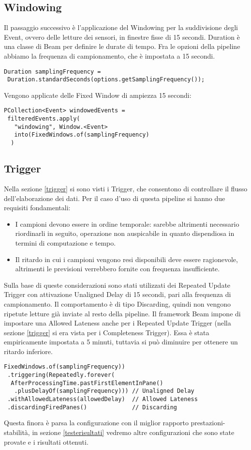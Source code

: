 \subsection{Windowing}
Il passaggio successivo è l'applicazione del Windowing per la suddivisione degli Event, ovvero delle letture dei sensori, in finestre fisse di 15 secondi. 
Duration è una classe di Beam per definire le durate di tempo. Fra le opzioni della pipeline abbiamo la frequenza di campionamento, che è impostata a 15 secondi.
\begin{lstlisting}
Duration samplingFrequency = 
 Duration.standardSeconds(options.getSamplingFrequency());
\end{lstlisting}
Vengono applicate delle Fixed Window di ampiezza 15 secondi:
\begin{lstlisting}
PCollection<Event> windowedEvents = 
 filteredEvents.apply(
   "windowing", Window.<Event> 
   into(FixedWindows.of(samplingFrequency)
  )
\end{lstlisting}
\subsection{Trigger}
Nella sezione \ref{trigger} si sono visti i Trigger, che consentono di controllare il flusso dell'elaborazione dei dati. Per il caso d'uso di questa pipeline si hanno due requisiti fondamentali:
\begin{itemize}
\item I campioni devono essere in ordine temporale: sarebbe altrimenti necessario riordinarli in seguito, operazione non auspicabile in quanto dispendiosa in termini di computazione e tempo.
\item Il ritardo in cui i campioni vengono resi disponibili deve essere ragionevole, altrimenti le previsioni verrebbero fornite con frequenza insufficiente.
\end{itemize}
Sulla base di queste considerazioni sono stati utilizzati dei Repeated Update Trigger con attivazione Unaligned Delay di 15 secondi, pari alla frequenza di campionamento. Il comportamento è di tipo Discarding, quindi non vengono ripetute letture già inviate al resto della pipeline. Il framework Beam impone di impostare una Allowed Lateness anche per i Repeated Update Trigger (nella sezione \ref{trigger} si era vista per i Completeness Trigger). Essa è stata empiricamente impostata a 5 minuti, tuttavia si può diminuire per ottenere un ritardo inferiore.
\begin{lstlisting}
FixedWindows.of(samplingFrequency))
 .triggering(Repeatedly.forever(
  AfterProcessingTime.pastFirstElementInPane()
   .plusDelayOf(samplingFrequency))) // Unaligned Delay
 .withAllowedLateness(allowedDelay)  // Allowed Lateness
 .discardingFiredPanes()             // Discarding
\end{lstlisting}
Questa finora è parsa la configurazione con il miglior rapporto prestazioni-stabilità, in sezione \ref{testerisultati} vedremo altre configurazioni che sono state provate e i risultati ottenuti.
